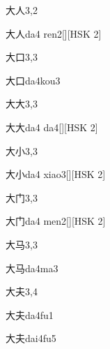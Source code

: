 \begin{entry}{大人}{3,2}
  \begin{phonetics}{大人}{da4 ren2}[][HSK 2]
  \end{phonetics}
\end{entry}

\begin{entry}{大口}{3,3}
  \begin{phonetics}{大口}{da4kou3}
  \end{phonetics}
\end{entry}

\begin{entry}{大大}{3,3}
  \begin{phonetics}{大大}{da4 da4}[][HSK 2]
  \end{phonetics}
\end{entry}

\begin{entry}{大小}{3,3}
  \begin{phonetics}{大小}{da4 xiao3}[][HSK 2]
  \end{phonetics}
\end{entry}

\begin{entry}{大门}{3,3}
  \begin{phonetics}{大门}{da4 men2}[][HSK 2]
  \end{phonetics}
\end{entry}

\begin{entry}{大马}{3,3}
  \begin{phonetics}{大马}{da4ma3}
  \end{phonetics}
\end{entry}

\begin{entry}{大夫}{3,4}
  \begin{phonetics}{大夫}{da4fu1}
  \end{phonetics}
  \begin{phonetics}{大夫}{dai4fu5}
  \end{phonetics}
\end{entry}

